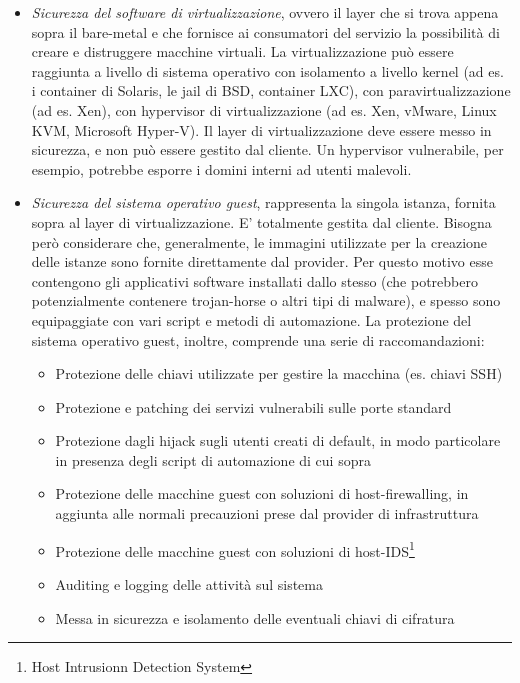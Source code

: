 \begin{itemize}
\item \textit{Sicurezza del software di virtualizzazione}, ovvero il layer che si trova appena sopra il bare-metal e che fornisce ai consumatori del servizio la possibilità di creare e distruggere macchine virtuali. La virtualizzazione può essere raggiunta a livello di sistema operativo con isolamento a livello kernel (ad es. i container di Solaris, le jail di BSD, container LXC), con paravirtualizzazione (ad es. Xen), con hypervisor di virtualizzazione (ad es. Xen, vMware, Linux KVM, Microsoft Hyper-V). Il layer di virtualizzazione deve essere messo in sicurezza, e non può essere gestito dal cliente.\cite{CloudSecurityBook}
Un hypervisor vulnerabile, per esempio, potrebbe esporre i domini interni ad utenti malevoli. 
\item \textit{Sicurezza del sistema operativo guest}, rappresenta la singola istanza, fornita sopra al layer di virtualizzazione. E' totalmente gestita dal cliente.
Bisogna però considerare che, generalmente, le immagini utilizzate per la creazione delle istanze sono fornite direttamente dal provider. Per questo motivo esse contengono gli applicativi software installati dallo stesso (che potrebbero potenzialmente contenere trojan-horse o altri tipi di malware), e spesso sono equipaggiate con vari script e metodi di automazione.\cite{CloudSecurityBook}
La protezione del sistema operativo guest, inoltre, comprende una serie di raccomandazioni:
\begin{itemize}
\item Protezione delle chiavi utilizzate per gestire la macchina (es. chiavi SSH)
\item Protezione e patching dei servizi vulnerabili sulle porte standard
\item Protezione dagli hijack sugli utenti creati di default, in modo particolare in presenza degli script di automazione di cui sopra
\item Protezione delle macchine guest con soluzioni di host-firewalling, in aggiunta alle normali precauzioni prese dal provider di infrastruttura
\item Protezione delle macchine guest con soluzioni di host-IDS\footnote{Host Intrusionn Detection System}
\item Auditing e logging delle attività sul sistema
\item Messa in sicurezza e isolamento delle eventuali chiavi di cifratura
\end{itemize}
\end{itemize}
